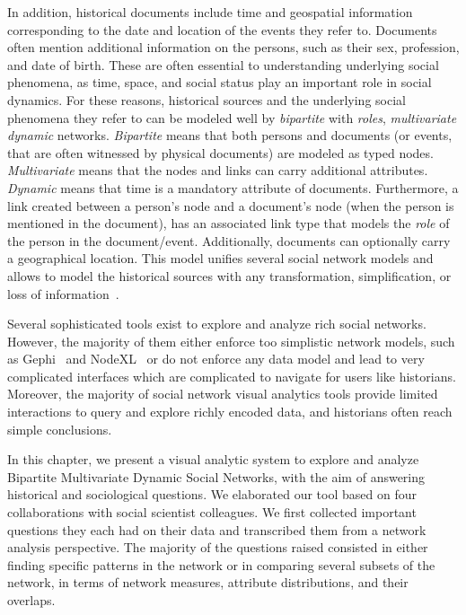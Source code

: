 In addition, historical documents include time and geospatial information corresponding to the date and location of the events they refer to.
Documents often mention additional information on the persons, such as their sex, profession, and date of birth.
These are often essential to understanding underlying social phenomena, as time, space, and social status play an important role in social dynamics.
For these reasons, historical sources and the underlying social phenomena they refer to can be modeled well by \emph{bipartite} with \emph{roles},  \emph{multivariate} \emph{dynamic} networks. \emph{Bipartite} means that both persons and documents (or events, that are often witnessed by physical documents) are modeled as typed nodes. \emph{Multivariate} means that the nodes and links can carry additional attributes. \emph{Dynamic} means that time is a mandatory attribute of documents.
Furthermore, a link created between a person's node and a document's node (when the person is mentioned in the document), has an associated link type that models the \emph{role} of the person in the document/event.
Additionally, documents can optionally carry a geographical location.
This model unifies several social network models and allows to model the historical sources with any transformation, simplification, or loss of information~\cite{cristofoliAuxSourcesGrands2008}.

Several sophisticated tools exist to explore and analyze rich social networks.
However, the majority of them either enforce too simplistic network models, such as Gephi~\cite{Gephi} and NodeXL~\cite{NodeXL} or do not enforce any data model and lead to very complicated interfaces which are complicated to navigate for users like historians.
Moreover, the majority of social network visual analytics tools provide limited interactions to query and explore richly encoded data, and historians often reach simple conclusions.


In this chapter, we present a visual analytic system to explore and analyze Bipartite Multivariate Dynamic Social Networks, with the aim of answering historical and sociological questions.
We elaborated our tool based on four collaborations with social scientist colleagues.
We first collected important questions they each had on their data and transcribed them from a network analysis perspective.
The majority of the questions raised consisted in either finding specific patterns in the network or in comparing several subsets of the network, in terms of network measures, attribute distributions, and their overlaps.


